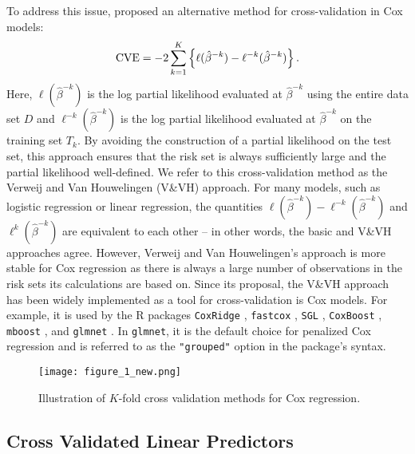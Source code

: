 To address this issue, \citet{Verweij1993} proposed an alternative method for cross-validation in Cox models:
\begin{equation}
  \label{eq:VVH}
  \textrm{CVE} = -2\sum_{k = 1}^K \left\{ \ell(\hat{\beta}^{- k})  - \ell^{-k}(\hat{\beta}^{- k}) \right\}. 
\end{equation}
Here, $\ell(\hat{\beta}^{-k})$ is the log partial likelihood evaluated at $\hat{\beta}^{-k}$ using the entire data set $D$ and $\ell^{-k}(\hat{\beta}^{-k})$ is the log partial likelihood evaluated at $\hat{\beta}^{-k}$ on
the training set $T_k$. By avoiding the construction of a partial likelihood on the test set, this approach ensures that the risk set is always sufficiently large and the partial likelihood well-defined.  We refer to this cross-validation method as the Verweij and Van Houwelingen (V\&VH) approach. For many models, such as logistic regression or linear regression, the quantities $\ell(\hat{\beta}^{- k})  - \ell^{-k}(\hat{\beta}^{- k})$ and  $\ell^{k}(\hat{\beta}^{-k})$ are equivalent to each other -- in other words, the basic and V\&VH approaches agree.  However, Verweij and Van Houwelingen's approach is more stable for Cox regression as there is always a large number of observations in the risk sets its calculations are based on.  Since its proposal, the V\&VH approach has been widely implemented as a tool for cross-validation is Cox models.  For example, it is used by the R packages {\tt CoxRidge} \citep{CoxRidge}, {\tt fastcox} \citep{fastcox}, {\tt SGL} \citep{SGL} , {\tt CoxBoost} \citep{CoxBoost}, {\tt mboost} \citep{mboost}, and {\tt glmnet} \citep{glmnet}.  In {\tt glmnet}, it is the default choice for penalized Cox regression and is referred to as the \verb|"grouped"| option in the package's syntax.

\begin{figure}
  \centering
  \texttt{[image: figure\_1\_new.png]}
  \caption{\label{Fig:methods} Illustration of $K$-fold cross validation methods for Cox regression.}
\end{figure}	

\subsection{Cross Validated Linear Predictors}
\label{Sec:linear-predictor}

